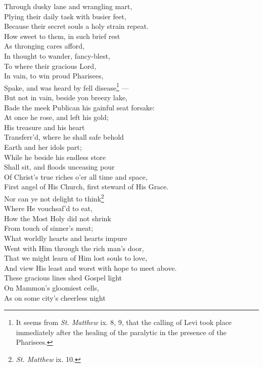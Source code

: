  Through dusky lane and wrangling mart, \\
 Plying their daily task with busier feet, \\
 Because their secret souls a holy strain repeat. \\
  How sweet to them, in such brief rest \\
 As thronging cares afford, \\
 In thought to wander, fancy-blest, \\
 To where their gracious Lord, \\
 In vain, to win proud Pharisees, \\
 Spake, and was heard by fell disease\footnote{It seems from \emph{St. Matthew} ix. 8, 9, that the calling of Levi took place immediately after the healing of the paralytic in the presence of the Pharisees.} — \\
 But not in vain, beside yon breezy lake, \\
 Bade the meek Publican his gainful seat forsake: \\
  At once he rose, and left his gold; \\
 His treasure and his heart \\
 Transferr’d, where he shall safe behold \\
 Earth and her idols part; \\
 While he beside his endless store \\
 Shall sit, and floods unceasing pour \\
 Of Christ’s true riches o’er all time and space, \\
 First angel of His Church, first steward of His Grace. \\
  Nor can ye not delight to think\footnote{\emph{St. Matthew} ix. 10.} \\
 Where He vouchsaf’d to eat, \\
 How the Most Holy did not shrink \\
 From touch of sinner’s meat; \\
 What worldly hearts and hearts impure \\
 Went with Him through the rich man’s door, \\
 That we might learn of Him lost souls to love, \\
 And view His least and worst with hope to meet above. \\
  These gracious lines shed Gospel light \\
 On Mammon’s gloomiest cells, \\
 As on some city’s cheerless night \\
